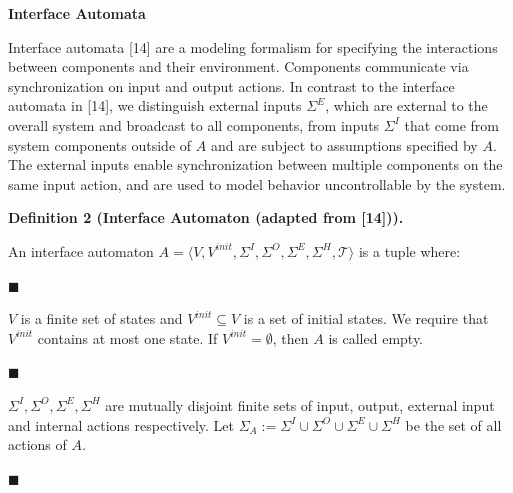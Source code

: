 \documentclass[10pt,a4paper]{article}
\begin{document}
\par\medskip\noindent\textbf{Interface Automata}\par
 
 
Interface automata [14] are a modeling formalism for specifying the interactions between components and their environment. Components communicate via synchronization on input and output actions. In contrast to the interface automata in [14], we distinguish external inputs $\Sigma^{E}$, which are external to the overall system and broadcast to all components, from inputs $\Sigma^{I}$ that come from system components outside of $A$ and are subject to assumptions specified by $A$. The external inputs enable synchronization between multiple components on the same input action, and are used to model behavior uncontrollable by the system.\par
 
 
 
\par\medskip\noindent\textbf{Definition 2 (Interface Automaton (adapted from [14])).}\par
 
 
An interface automaton $A=\langle V,V^{init},\Sigma^{I},\Sigma^{O},\Sigma^{E},\Sigma^{H},\mathcal{T}\rangle$ is a tuple where:\par
  
\par\noindent  $\blacksquare$ 
 
$V$ is a finite set of states and $V^{init}\subseteq V$ is a set of initial states. We require that $V^{init}$ contains at most one state. If $V^{init}=\emptyset$, then $A$ is called empty.\par
 
 
 
\par\noindent  $\blacksquare$ 
 
$\Sigma^{I},\Sigma^{O},\Sigma^{E},\Sigma^{H}$ are mutually disjoint finite sets of input, output, external input and internal actions respectively. Let $\Sigma_{A}:=\Sigma^{I}\cup\Sigma^{O}\cup\Sigma^{E}\cup\Sigma^{H}$ be the set of all actions of $A$.\par
 
 
 
\par\noindent  $\blacksquare$ 
 
\end{document}
